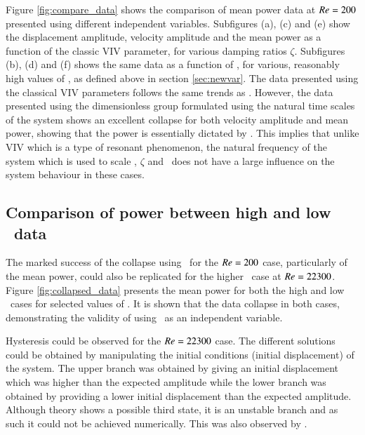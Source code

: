 Figure \ref{fig:compare_data} shows the comparison of mean power data at $Re=200$ presented using different independent variables. Subfigures (a), (c) and (e) show the displacement amplitude, velocity amplitude and the mean power as a function of the classic VIV parameter, \ustar for various damping ratios $\zeta$. Subfigures (b), (d) and (f) shows the same data as a function of \massdamp, for various, reasonably high values of \massstiff, as defined above in section \ref{sec:newvar}. The data presented using the classical VIV parameters follows the same trends as \cite{Barrero-Gil2010a}. However, the data presented using the dimensionless group formulated using the natural time scales of the system shows an excellent collapse for both velocity amplitude and mean power, showing that the power is essentially dictated by \massdamp. This implies that unlike VIV which is a type of resonant phenomenon, the natural frequency of the system which is used to scale \ustar, $\zeta$ and \massstiff\ does not have a large influence on the system behaviour in these cases.


    
\subsection{Comparison of power between high and low \reynoldsnumber\ data}   
\label{sec:low_vs_high_re}
The marked success of the collapse using \massdamp\ for the $Re = 200$ case, particularly of the mean power, could also be replicated for the higher \reynoldsnumber\ case at $Re = 22300$. Figure \ref{fig:collapsed_data} presents the mean power for both the high and low \reynoldsnumber\ cases for selected values of \massstiff. It is shown that the data collapse in both cases, demonstrating the validity of using \massdamp\ as an independent variable.
\vspace{30mm}

         
Hysteresis could be observed for the $Re = 22300$ case. The different solutions could be obtained by manipulating the initial conditions (initial displacement) of the system. The upper branch was obtained by giving an initial displacement which was higher than the expected amplitude while the lower branch was obtained by providing a lower initial displacement than the expected amplitude. Although theory shows a possible third state, it is an unstable branch and as such it could not be achieved numerically. This was also observed by \cite{Vio2007}. 


